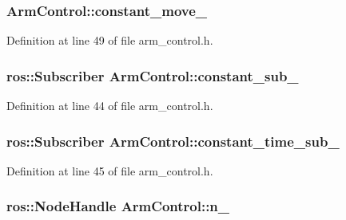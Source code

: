 \subsubsection[{constant\-\_\-move\-\_\-}]{ {\bf \-Arm\-Control\-::constant\-\_\-move\-\_\-}\hspace{0.3cm}{\ttfamily  [private]}}\label{classArmControl_a891d406c9be6c6e3801a2e392364fcd1}


\-Definition at line 49 of file arm\-\_\-control.\-h.

\subsubsection[{constant\-\_\-sub\-\_\-}]{\setlength{\rightskip}{0pt plus 5cm}ros\-::\-Subscriber {\bf \-Arm\-Control\-::constant\-\_\-sub\-\_\-}\hspace{0.3cm}{\ttfamily  [private]}}\label{classArmControl_a51f82f2c94949fc24393d496dc41f16b}


\-Definition at line 44 of file arm\-\_\-control.\-h.

\subsubsection[{constant\-\_\-time\-\_\-sub\-\_\-}]{\setlength{\rightskip}{0pt plus 5cm}ros\-::\-Subscriber {\bf \-Arm\-Control\-::constant\-\_\-time\-\_\-sub\-\_\-}\hspace{0.3cm}{\ttfamily  [private]}}\label{classArmControl_abb25af1f32fb8fec007972182d54d7d1}


\-Definition at line 45 of file arm\-\_\-control.\-h.

\subsubsection[{n\-\_\-}]{\setlength{\rightskip}{0pt plus 5cm}ros\-::\-Node\-Handle {\bf \-Arm\-Control\-::n\-\_\-}\hspace{0.3cm}{\ttfamily  [private]}}\label{classArmControl_ac7aac224c9d677c0ae7fe94de9d8f5ce}


